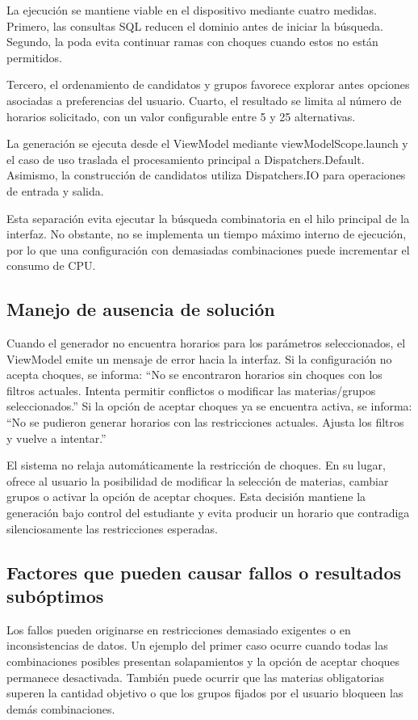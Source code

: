 La ejecución se mantiene viable en el dispositivo mediante cuatro medidas. Primero, las consultas SQL reducen el dominio antes de iniciar la búsqueda. Segundo, la poda evita continuar ramas con choques cuando estos no están permitidos.

Tercero, el ordenamiento de candidatos y grupos favorece explorar antes opciones asociadas a preferencias del usuario. Cuarto, el resultado se limita al número de horarios solicitado, con un valor configurable entre 5 y 25 alternativas.

La generación se ejecuta desde el ViewModel mediante viewModelScope.launch y el caso de uso traslada el procesamiento principal a Dispatchers.Default. Asimismo, la construcción de candidatos utiliza Dispatchers.IO para operaciones de entrada y salida.

Esta separación evita ejecutar la búsqueda combinatoria en el hilo principal de la interfaz. No obstante, no se implementa un tiempo máximo interno de ejecución, por lo que una configuración con demasiadas combinaciones puede incrementar el consumo de CPU.

\subsection{Manejo de ausencia de solución}
Cuando el generador no encuentra horarios para los parámetros seleccionados, el ViewModel emite un mensaje de error hacia la interfaz. Si la configuración no acepta choques, se informa: ``No se encontraron horarios sin choques con los filtros actuales. Intenta permitir conflictos o modificar las materias/grupos seleccionados.'' Si la opción de aceptar choques ya se encuentra activa, se informa: ``No se pudieron generar horarios con las restricciones actuales. Ajusta los filtros y vuelve a intentar.''

El sistema no relaja automáticamente la restricción de choques. En su lugar, ofrece al usuario la posibilidad de modificar la selección de materias, cambiar grupos o activar la opción de aceptar choques. Esta decisión mantiene la generación bajo control del estudiante y evita producir un horario que contradiga silenciosamente las restricciones esperadas.

\subsection{Factores que pueden causar fallos o resultados subóptimos}
Los fallos pueden originarse en restricciones demasiado exigentes o en inconsistencias de datos. Un ejemplo del primer caso ocurre cuando todas las combinaciones posibles presentan solapamientos y la opción de aceptar choques permanece desactivada. También puede ocurrir que las materias obligatorias superen la cantidad objetivo o que los grupos fijados por el usuario bloqueen las demás combinaciones.

